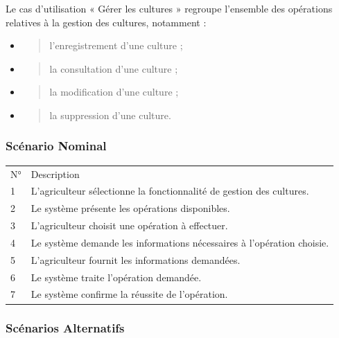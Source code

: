 \documentclass[
]{article}
\begin{document}
Le cas d'utilisation « Gérer les cultures » regroupe l'ensemble des
opérations relatives à la gestion des cultures, notamment :

\begin{itemize}
\item
  \begin{quote}
  l'enregistrement d'une culture ;
  \end{quote}
\item
  \begin{quote}
  la consultation d'une culture ;
  \end{quote}
\item
  \begin{quote}
  la modification d'une culture ;
  \end{quote}
\item
  \begin{quote}
  la suppression d'une culture.
  \end{quote}
\end{itemize}

\hypertarget{scuxe9nario-nominal-1}{%
\subsubsection{Scénario Nominal}\label{scuxe9nario-nominal-1}}

\begin{longtable}[]{@{}ll@{}}
\toprule
\endhead
N° & Description \\
1 & L'agriculteur sélectionne la fonctionnalité de gestion des
cultures. \\
2 & Le système présente les opérations disponibles. \\
3 & L'agriculteur choisit une opération à effectuer. \\
4 & Le système demande les informations nécessaires à l'opération
choisie. \\
5 & L'agriculteur fournit les informations demandées. \\
6 & Le système traite l'opération demandée. \\
7 & Le système confirme la réussite de l'opération. \\
\bottomrule
\end{longtable}

\hypertarget{scuxe9narios-alternatifs-1}{%
\subsubsection{Scénarios Alternatifs}\label{scuxe9narios-alternatifs-1}}
\end{document}
